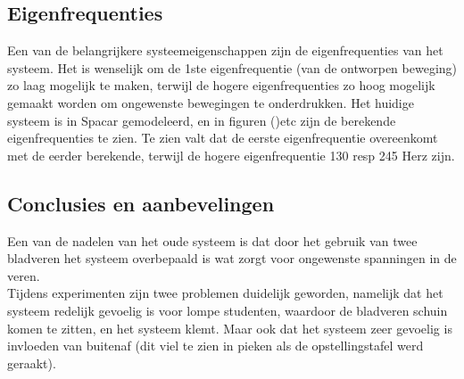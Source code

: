 \documentclass[a4paper]{article}
\begin{document}
\subsection{Eigenfrequenties}
Een van de belangrijkere systeemeigenschappen zijn de eigenfrequenties van het systeem. Het is wenselijk om de 1ste eigenfrequentie (van de ontworpen beweging) zo laag mogelijk te maken, terwijl de hogere eigenfrequenties zo hoog mogelijk gemaakt worden om ongewenste bewegingen te onderdrukken. Het huidige systeem is in Spacar gemodeleerd, en in figuren ()etc zijn de berekende eigenfrequenties te zien. Te zien valt dat de eerste eigenfrequentie overeenkomt met de eerder berekende, terwijl de hogere eigenfrequentie 130 resp 245 Herz zijn.
\subsection{Conclusies en aanbevelingen}
Een van de nadelen van het oude systeem is dat door het gebruik van twee bladveren het systeem overbepaald is wat zorgt voor ongewenste spanningen in de veren. \\ Tijdens experimenten zijn twee problemen duidelijk geworden, namelijk dat het systeem redelijk gevoelig is voor lompe studenten, waardoor de bladveren schuin komen te zitten, en het systeem klemt. Maar ook dat het systeem zeer gevoelig is invloeden van buitenaf (dit viel te zien in pieken als de opstellingstafel werd geraakt).  \\
\end{document}
